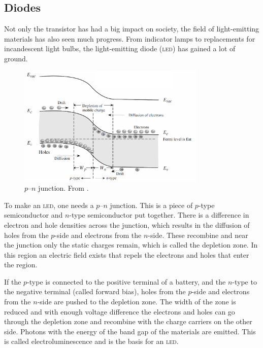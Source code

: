 \subsection{Diodes}
Not only the transistor has had a big impact on society, the field of light-emitting materials has also seen much progress. From indicator lamps to replacements for incandescent light bulbs, the light-emitting diode (\textsc{led}) has gained a lot of ground.

\begin{figure}[!ht]
 \begin{center}
  \includegraphics[width=0.8\textwidth]{pn_junction}
  \caption{$p$--$n$ junction. From \citet{vanweesbook}.}
  \label{fig:pn_junction}
 \end{center}
\end{figure}

To make an \textsc{led}, one needs a $p$--$n$ junction. This is a piece of $p$-type semiconductor and $n$-type semiconductor put together. There is a difference in electron and hole densities across the junction, which results in the diffusion of holes from the $p$-side and electrons from the $n$-side. These recombine and near the junction only the static charges remain, which is called the depletion zone. In this region an electric field exists that repels the electrons and holes that enter the region.

If the $p$-type is connected to the positive terminal of a battery, and the $n$-type to the negative terminal (called forward bias), holes from the $p$-side and electrons from the $n$-side are pushed to the depletion zone. The width of the zone is reduced and with enough voltage difference the electrons and holes can go through the depletion zone and recombine with the charge carriers on the other side. Photons with the energy of the band gap of the materials are emitted. This is called electroluminescence and is the basis for an \textsc{led}.

